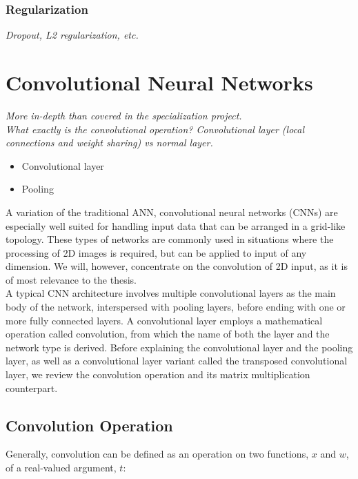 \subsubsection{Regularization}

\textit{Dropout, L2 regularization, etc.}

\section{Convolutional Neural Networks}

\textit{More in-depth than covered in the specialization project. \\
What exactly is the convolutional operation? Convolutional layer (local connections and weight sharing) vs normal layer.}

\begin{itemize}
    \item Convolutional layer
    \item Pooling
\end{itemize}

A variation of the traditional ANN, convolutional neural networks (CNNs) are especially well suited for handling input data that can be arranged in a grid-like topology. These types of networks are commonly used in situations where the processing of 2D images is required, but can be applied to input of any dimension. We will, however, concentrate on the convolution of 2D input, as it is of most relevance to the thesis. \\

\noindent A typical CNN architecture involves multiple convolutional layers as the main body of the network, interspersed with pooling layers, before ending with one or more fully connected layers. A convolutional layer employs a mathematical operation called convolution, from which the name of both the layer and the network type is derived. Before explaining the convolutional layer and the pooling layer, as well as a convolutional layer variant called the transposed convolutional layer, we review the convolution operation and its matrix multiplication counterpart.

\subsection{Convolution Operation}

Generally, convolution can be defined as an operation on two functions, $x$ and $w$, of a real-valued argument, $t$:

